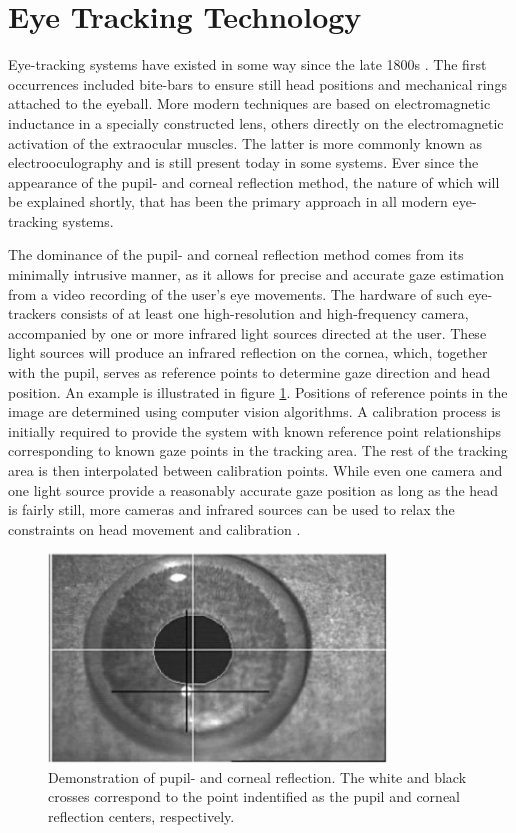 \section{Eye Tracking Technology} \label{sec:bt/ET_tech}

Eye-tracking systems have existed in some way since the late 1800s \cite{holmqvist2011}. The first occurrences included bite-bars to ensure still head positions and mechanical rings attached to the eyeball. More modern techniques are based on electromagnetic inductance in a specially constructed lens, others directly on the electromagnetic activation of the extraocular muscles. The latter is more commonly known as electrooculography and is still present today in some systems. Ever since the appearance of the pupil- and corneal reflection method, the nature of which will be explained shortly, that has been the primary approach in all modern eye-tracking systems. 

The dominance of the pupil- and corneal reflection method comes from its minimally intrusive manner, as it allows for precise and accurate gaze estimation from a video recording of the user's eye movements. The hardware of such eye-trackers consists of at least one high-resolution and high-frequency camera, accompanied by one or more infrared light sources directed at the user. These light sources will produce an infrared reflection on the cornea, which, together with the pupil, serves as reference points to determine gaze direction and head position. An example is illustrated in figure \ref{fig:bt_pupil_corneal_reflection}. Positions of reference points in the image are determined using computer vision algorithms. A calibration process is initially required to provide the system with known reference point relationships corresponding to known gaze points in the tracking area. The rest of the tracking area is then interpolated between calibration points. While even one camera and one light source provide a reasonably accurate gaze position as long as the head is fairly still, more cameras and infrared sources can be used to relax the constraints on head movement and calibration \cite{holmqvist2011}. 

\begin{figure}[h]
    \centering
    \includegraphics[width=0.8\textwidth]{figures/bt_pupil_corneal_reflection.png}
    \caption{Demonstration of pupil- and corneal reflection. The white and black crosses correspond to the point indentified as the pupil and corneal reflection centers, respectively.}
    \label{fig:bt_pupil_corneal_reflection}
\end{figure}

